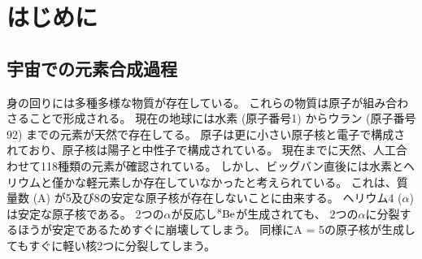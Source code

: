 \documentclass[../master]{subfiles}
\begin{document}
\chapter{はじめに}
\section{宇宙での元素合成過程}
\label{seq::nucleaosynthesis}
身の回りには多種多様な物質が存在している。
これらの物質は原子が組み合わさることで形成される。
現在の地球には水素 (原子番号1) からウラン (原子番号92) までの元素が天然で存在してる。
原子は更に小さい原子核と電子で構成されており、原子核は陽子と中性子で構成されている。
現在までに天然、人工合わせて118種類の元素が確認されている。
しかし、ビッグバン直後には水素とヘリウムと僅かな軽元素しか存在していなかったと考えられている。
これは、質量数 (A) が5及び8の安定な原子核が存在しないことに由来する。
ヘリウム4 ($\alpha$) は安定な原子核である。
2つの$\alpha$が反応し${}^{8}{\rm Be}$が生成されても、
2つの$\alpha$に分裂するほうが安定であるためすぐに崩壊してしまう。
同様にA = 5の原子核が生成してもすぐに軽い核2つに分裂してしまう。
\end{document}
